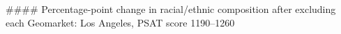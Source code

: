 #### Percentage-point change in racial/ethnic composition after excluding each Geomarket: Los Angeles, PSAT score 1190–1260

